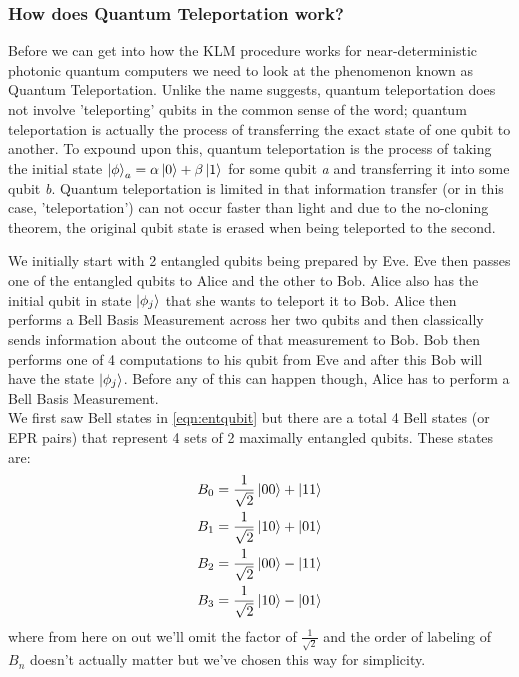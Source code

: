 \subsubsection{How does Quantum Teleportation work?}
Before we can get into how the KLM procedure works for near-deterministic photonic quantum computers we need to look at the phenomenon known as Quantum Teleportation. Unlike the name suggests, quantum teleportation does not involve 'teleporting' qubits in the common sense of the word; quantum teleportation is actually the process of transferring the exact state of one qubit to another. To expound upon this, quantum teleportation is the process of taking the initial state $\ket{\phi}_a = \alpha\ket{0} + \beta\ket{1}$ for some qubit \textit{a} and transferring it into some qubit \textit{b}. Quantum teleportation is limited in that information transfer (or in this case, 'teleportation') can not occur faster than light and due to the no-cloning theorem, the original qubit state is erased when being teleported to the second.
\par
We initially start with 2 entangled qubits being prepared by Eve. Eve then passes one of the entangled qubits to Alice and the other to Bob. Alice also has the initial qubit in state $\ket{\phi_j}$ that she wants to teleport it to Bob. Alice then performs a Bell Basis Measurement across her two qubits and then classically sends information about the outcome of that measurement to Bob. Bob then performs one of 4 computations to his qubit from Eve and after this Bob will have the state $\ket{\phi_j}$. Before any of this can happen though, Alice has to perform a Bell Basis Measurement. \\
We first saw Bell states in  \cref{eqn:entqubit} but there are a total 4 Bell states (or EPR pairs) that represent 4 sets of 2 maximally entangled qubits. These states are:
\begin{align}\label{eqn:Bell States}
    B_0 &= \frac{1}{\sqrt{2}}\ket{00} + \ket{11} \\
    B_1 &= \frac{1}{\sqrt{2}}\ket{10} + \ket{01} \\
    B_2 &= \frac{1}{\sqrt{2}}\ket{00} - \ket{11} \\
    B_3 &= \frac{1}{\sqrt{2}}\ket{10} - \ket{01} \\
\end{align} \cite{nielsen_chuang_2010}
where from here on out we'll omit the factor of $\frac{1}{\sqrt{2}}$ and the order of labeling of $B_n$ doesn't actually matter but we've chosen this way for simplicity. 
\par
